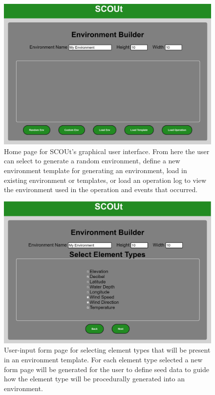 \begin{figure}[!htb]
  \centering
  \includegraphics[width=0.725\columnwidth]{Figures/Visualizer/home_page.JPG}
  \caption[GUI Home Page]{Home page for SCOUt's graphical user interface. From here the user can select to generate a random environment, define a new environment template for generating an environment, load in existing environment or templates, or load an operation log to view the environment used in the operation and events that occurred.}
  \label{fig:visualizer_home_page}
\end{figure}

\begin{figure}[!htb]
  \centering
  \includegraphics[width=0.725\columnwidth]{Figures/Visualizer/Forms/Visualizer-Forms-Element-Types.JPG}
  \caption[GUI Element Types Form]{User-input form page for selecting element types that will be present in an environment template. For each element type selected a new form page will be generated for the user to define seed data to guide how the element type will be procedurally generated into an environment.}
  \label{fig:example_form_page}
\end{figure}

